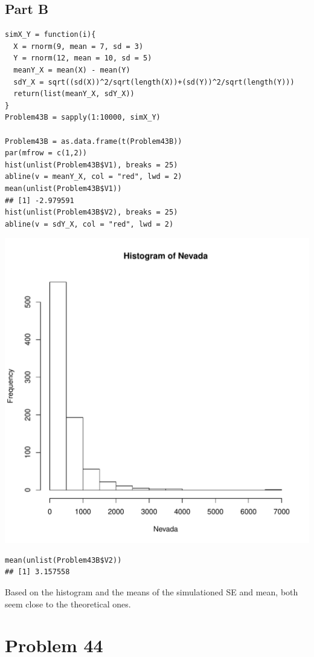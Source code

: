 \documentclass{article}\usepackage[]{graphicx}\usepackage[]{color}
\makeatletter
\newenvironment{kframe}{%
 \def\at@end@of@kframe{}%
 \ifinner\ifhmode%
  \def\at@end@of@kframe{\end{minipage}}%
  \begin{minipage}{\columnwidth}%
 \fi\fi%
 \def\FrameCommand##1{\hskip\@totalleftmargin \hskip-\fboxsep
 \colorbox{shadecolor}{##1}\hskip-\fboxsep
     \hskip-\linewidth \hskip-\@totalleftmargin \hskip\columnwidth}%
 \MakeFramed {\advance\hsize-\width
   \@totalleftmargin\z@ \linewidth\hsize
   \@setminipage}}%
 {\par\unskip\endMakeFramed%
 \at@end@of@kframe}
\newenvironment{knitrout}{}{} %
\makeatother
\begin{document}
\subsection*{Part B}
\begin{knitrout}
\color{fgcolor}\begin{kframe}
\begin{verbatim}
simX_Y = function(i){
  X = rnorm(9, mean = 7, sd = 3)
  Y = rnorm(12, mean = 10, sd = 5)
  meanY_X = mean(X) - mean(Y)
  sdY_X = sqrt((sd(X))^2/sqrt(length(X))+(sd(Y))^2/sqrt(length(Y)))
  return(list(meanY_X, sdY_X))
}
Problem43B = sapply(1:10000, simX_Y)

Problem43B = as.data.frame(t(Problem43B))
par(mfrow = c(1,2))
hist(unlist(Problem43B$V1), breaks = 25)
abline(v = meanY_X, col = "red", lwd = 2)
mean(unlist(Problem43B$V1))
## [1] -2.979591
hist(unlist(Problem43B$V2), breaks = 25)
abline(v = sdY_X, col = "red", lwd = 2)
\end{verbatim}
\end{kframe}
\includegraphics[width=0.33\linewidth]{figure/unnamed-chunk-4-1} 
\begin{kframe}\begin{verbatim}
mean(unlist(Problem43B$V2))
## [1] 3.157558
\end{verbatim}
\end{kframe}
\end{knitrout}
Based on the histogram and the means of the simulationed SE and mean, both seem close to the theoretical ones.
\section*{Problem 44}
\end{document}
